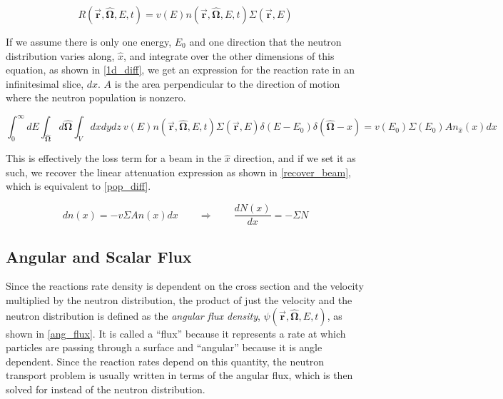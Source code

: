 \begin{equation}
\label{RR}
R(\boldsymbol{\vec{r}},\boldsymbol{\hat{\Omega}},E,t)  = v(E) n(\boldsymbol{\vec{r}},\boldsymbol{\hat{\Omega}},E,t) \Sigma(\boldsymbol{\vec{r}},E)
\end{equation}

If we assume there is only one energy, $E_0$ and one direction that the neutron distribution varies along, $\hat{x}$, and integrate over the other dimensions of this equation, as shown in \eqref{1d_diff}, we get an expression for the reaction rate in an infinitesimal slice, $dx$.  $A$ is the area perpendicular to the direction of motion where the neutron population is nonzero.


\begin{equation}
\label{1d_diff}
 \int_0^\infty dE \int_{\boldsymbol{\hat{\Omega}}} d\boldsymbol{\hat{\Omega}}  \int_{V} dx dy dz \:  v(E) n(\boldsymbol{\vec{r}},\boldsymbol{\hat{\Omega}},E,t) \Sigma(\boldsymbol{\vec{r}},E) \delta(E-E_0) \delta(\boldsymbol{\hat{\Omega}}-\hat{x})  = v(E_0) \Sigma(E_0) A n_{\hat{x}} (x) dx 
\end{equation}

This is effectively the loss term for a beam in the $\hat{x}$ direction, and if we set it as such, we recover the linear attenuation expression as shown in \eqref{recover_beam}, which is equivalent to \eqref{pop_diff}.  

\begin{equation}
\label{recover_beam}
dn(x) = - v \Sigma A n(x)dx  \qquad \Rightarrow \qquad  \frac{dN(x)}{dx}= - \Sigma N
\end{equation}


\subsection{Angular and Scalar Flux}

Since the reactions rate density is dependent on the cross section and the velocity multiplied by the neutron distribution, the product of just the velocity and the neutron distribution is defined as the \emph{angular flux density}, $\psi(\boldsymbol{\vec{r}},\boldsymbol{\hat{\Omega}},E,t)$,  as shown in \eqref{ang_flux}.  It is called a ``flux'' because it represents a rate at which particles are passing through a surface and ``angular'' because it is angle dependent.  Since the reaction rates depend on this quantity, the neutron transport problem is usually written in terms of the angular flux, which is then solved for instead of the neutron distribution.

